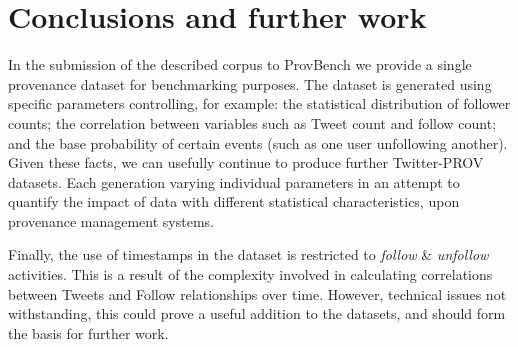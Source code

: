 \documentclass{llncs2e/llncs}
\begin{document}
\section{Conclusions and further work}
%
In the submission of the described corpus to ProvBench we provide a single provenance dataset for benchmarking purposes.
%
The dataset is generated using specific parameters controlling, for example:
%
the statistical distribution of follower counts;
%
the correlation between variables such as Tweet count and follow count;
%
and the base probability of certain events (such as one user unfollowing another).
%
Given these facts, we can usefully continue to produce further Twitter-PROV datasets.
%
Each generation varying individual parameters in an attempt to quantify the impact of data with different statistical characteristics, upon provenance management systems.
%

%
Finally, the use of timestamps in the dataset is restricted to \textit{follow} \& \textit{unfollow} activities. This is a result of the complexity involved in calculating correlations between Tweets and Follow relationships over time. However, technical issues not withstanding, this could prove a useful addition to the datasets, and should form the basis for further work.
\end{document}

